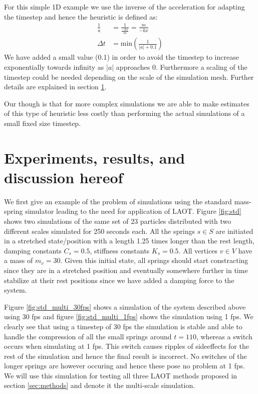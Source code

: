 \documentclass[11pt]{article}
\providecommand{\abs}[1]{\left \lvert #1 \right \rvert}
\begin{document}
For this simple 1D example we use the inverse of the acceleration
for adapting the timestep and hence the heuristic is defined as:
\begin{align}
    \frac{1}{a} &= \frac{1}{\frac{-kx}{m}} = \frac{m}{-kx} \\
    \label{eq:inverse}
    \Delta t &= \text{min}\left( \frac{1}{\abs{a} + 0.1} \right )
\end{align}
We have added a small value (0.1) in order to avoid the timestep to increase
exponentially towards infinity as $\abs{a}$ approaches 0. Furthermore a scaling
of the timestep could be needed depending on the scale of the simulation mesh.
Further details are explained in section \ref{sec:experiments}.

Our though is that for more complex simulations we are able to make estimates
of this type of heuristic less costly than performing the actual simulations
of a small fixed size timestep.


\section{Experiments, results, and discussion hereof}
\label{sec:experiments}

We first give an example of the problem of simulations using the standard
mass-spring simulator leading to the need for application of LAOT. Figure
\ref{fig:std} shows two simulations of the same set of 23 particles distributed
with two different scales simulated for 250 seconds each. All the springs
$s \in S$ are initiated in a stretched state/position with a length 1.25
times longer than the rest length, damping constants $C_s = 0.5$, stiffness
constants $K_s = 0.5$. All vertices $v \in V$ have a mass of $m_v = 30$. Given
this initial state, all springs should start constracting since they are in a
stretched position and eventually somewhere further in time stabilize at their
rest positions since we have added a damping force to the system.

Figure \ref{fig:std_multi_30fps} shows a simulation of the system described above
using 30 fps and figure \ref{fig:std_multi_1fps} shows the simulation using 1
fps. We clearly see that using a timestep of 30 fps the simulation is stable
and able to handle the compression of all the small springs around $t = 110$,
whereas a switch occurs when simulating at 1 fps. This switch causes ripples
of sideeffects for the rest of the simulation and hence the final result is
incorrect. No switches of the longer springs are however occuring and hence
these pose no problem at 1 fps. We will use this simulation for testing all
three LAOT methods proposed in section \ref{sec:methods} and denote it the
multi-scale simulation.
\end{document}
